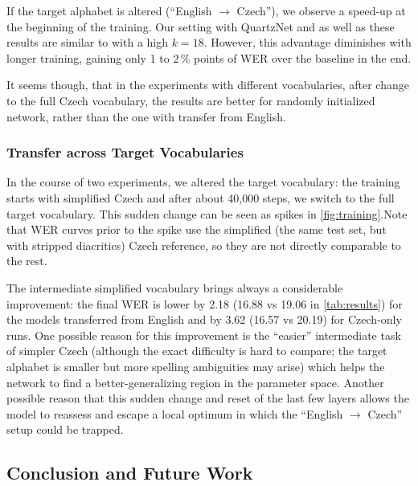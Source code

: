 If the target alphabet is altered (``English $\rightarrow$ Czech''), we observe a speed-up at the beginning of the training. Our setting with QuartzNet and as well as these results are similar to  with a high $k = 18$. %
However, this advantage diminishes with longer training, gaining only
1 to 2\,\% points of WER over the baseline in the end.

It seems though, that in the experiments with different vocabularies, after change to the full Czech vocabulary, the results are better for randomly initialized network, rather than the one with transfer from English.

\subsubsection{Transfer across Target Vocabularies}

In the course of two experiments, we altered the target vocabulary: the training starts with simplified Czech and after about 40,000 steps, we switch to the full target vocabulary. This sudden change can be seen as spikes in \cref{fig:training}.Note that WER curves prior to the spike use the simplified (the same test set, but with stripped diacritics) Czech reference, so they are not directly comparable to the rest.

The intermediate simplified vocabulary brings always a considerable improvement: the final WER is lower by 2.18 (16.88 vs 19.06 in \cref{tab:results}) for the models transferred from English and by 3.62 (16.57 vs 20.19) for Czech-only runs.
One possible reason for this improvement is the ``easier'' intermediate task of simpler Czech (although the exact difficulty is hard to compare; the target alphabet is smaller but more spelling ambiguities may arise) which helps the network to find a better-generalizing region in the parameter space. Another possible reason that this sudden change and reset of the last few layers allows the model to reassess and escape a local optimum in which the ``English $\rightarrow$ Czech'' setup could be trapped.


\subsection{Conclusion and Future Work}
\label{sec:conclusion}

